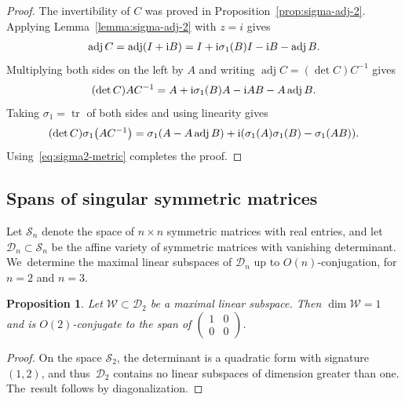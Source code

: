 \documentclass[10pt,a4paper]{amsart}
\def\adj{\operatorname{adj}}
\def\calS{\mathcal{S}}
\def\W{\mathscr{W}}
\def\D{\mathcal{D}}
\def\tr{\operatorname{tr}}
\newtheorem{Proposition}[Theorem]{Proposition}
\numberwithin{equation}{section}
\begin{document}
\begin{proof}
The invertibility of $C$ was proved in Proposition~\ref{prop:sigma-adj-2}. Applying Lemma~\ref{lemma:sigma-adj-2} with $z=i$ gives
\begin{gather*}
 \adj C = \adj(I + {\rm i} B) = I + {\rm i} \sigma_1 (B) I - {\rm i}B - \adj B.
 \end{gather*}
Multiplying both sides on the left by $A$ and writing $\adj C = (\det C) C^{-1}$ gives
\begin{gather*}
 (\det C) A C^{-1} = A + {\rm i} \sigma_1 (B) A - {\rm i} AB - A \adj B.
 \end{gather*}
Taking $\sigma_1 = \tr$ of both sides and using linearity gives
\begin{gather*}
(\det C) \sigma_1 \big(A C^{-1}\big) = \sigma_1 (A - A \adj B) + {\rm i} ( \sigma_1 (A) \sigma_1 (B) - \sigma_1 (AB) ).
\end{gather*}
Using~\eqref{eq:sigma2-metric} completes the proof.
\end{proof}

\subsection{Spans of singular symmetric matrices} \label{sec:app-singular}

Let $\calS_n$ denote the space of $n\times n$ symmetric matrices with real entries, and let $\D_n \subset \calS_n$ be the affine variety of symmetric matrices with vanishing determinant. We~determine the maximal linear subspaces of $\D_n$ up to $O(n)$-conjugation, for $n=2$ and $n=3$.

\begin{Proposition} \label{sing2max}
Let $\W \subset \D_2$ be a maximal linear subspace. Then $\dim \W =1$ and is $O(2)$-con\-jugate to the span of $\left(\begin{smallmatrix} 1 &0 \\ 0 & 0 \end{smallmatrix}\right)$.
\end{Proposition}
\begin{proof} On the space $\calS_2$, the determinant is a quadratic form with signature $(1,2)$, and thus~$\D_2$ contains no linear subspaces of dimension greater than one. The~result follows by diagona\-lization.
\end{proof}
\end{document}
